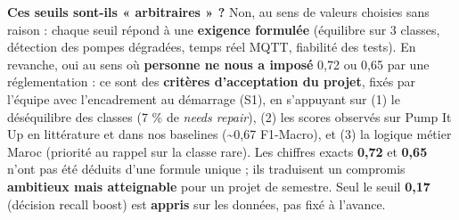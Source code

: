 \documentclass[11pt,a4paper]{report}
\begin{document}
\textbf{Ces seuils sont-ils « arbitraires » ?} Non, au sens de valeurs choisies sans raison : chaque seuil répond à une \textbf{exigence formulée} (équilibre sur 3 classes, détection des pompes dégradées, temps réel MQTT, fiabilité des tests). En revanche, oui au sens où \textbf{personne ne nous a imposé} 0,72 ou 0,65 par une réglementation : ce sont des \textbf{critères d'acceptation du projet}, fixés par l'équipe avec l'encadrement au démarrage (S1), en s'appuyant sur (1) le déséquilibre des classes (7 \% de \textit{needs repair}), (2) les scores observés sur Pump It Up en littérature et dans nos baselines (\textasciitilde{}0,67 F1-Macro), et (3) la logique métier Maroc (priorité au rappel sur la classe rare). Les chiffres exacts \textbf{0,72} et \textbf{0,65} n'ont pas été déduits d'une formule unique ; ils traduisent un compromis \textbf{ambitieux mais atteignable} pour un projet de semestre. Seul le seuil \textbf{0,17} (décision recall boost) est \textbf{appris} sur les données, pas fixé à l'avance.
\end{document}
